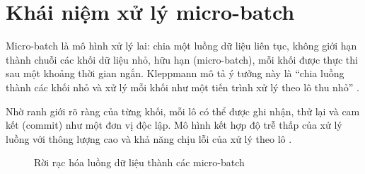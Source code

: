 \section{Khái niệm xử lý micro-batch}
\label{sec:2-definition}

Micro-batch là mô hình xử lý lai: chia một luồng dữ liệu liên tục, không giới hạn thành chuỗi các khối dữ liệu nhỏ, hữu hạn (micro-batch), mỗi khối được thực thi sau một khoảng thời gian ngắn. Kleppmann mô tả ý tưởng này là ``chia luồng thành các khối nhỏ và xử lý mỗi khối như một tiến trình xử lý theo lô thu nhỏ'' \cite{kleppmann2017ddia}.

Nhờ ranh giới rõ ràng của từng khối, mỗi lô có thể được ghi nhận, thử lại và cam kết (commit) như một đơn vị độc lập. Mô hình kết hợp độ trễ thấp của xử lý luồng với thông lượng cao và khả năng chịu lỗi của xử lý theo lô \cite{conduktor_microbatch}.

\begin{figure}[H]
\centering
{}
\caption{Rời rạc hóa luồng dữ liệu thành các micro-batch}
\label{fig:2-microbatch-concept}
\end{figure}
